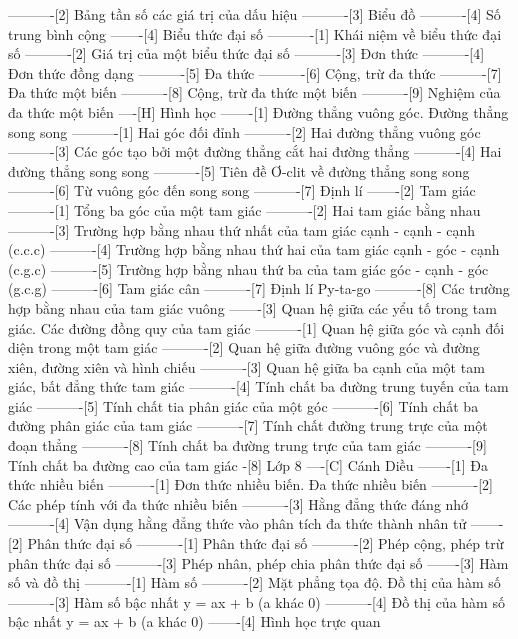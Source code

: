 ----------[2] Bảng tần số các giá trị của dấu hiệu
----------[3] Biểu đồ
----------[4] Số trung bình cộng
-------[4] Biểu thức đại số
----------[1] Khái niệm về biểu thức đại số
----------[2] Giá trị của một biểu thức đại số
----------[3] Đơn thức
----------[4] Đơn thức đồng dạng
----------[5] Đa thức
----------[6] Cộng, trừ đa thức
----------[7] Đa thức một biến
----------[8] Cộng, trừ đa thức một biến
----------[9] Nghiệm của đa thức một biến
----[H] Hình học
-------[1] Đường thẳng vuông góc. Đường thẳng song song
----------[1] Hai góc đối đỉnh
----------[2] Hai đường thẳng vuông góc
----------[3] Các góc tạo bởi một đường thẳng cắt hai đường thẳng
----------[4] Hai đường thẳng song song
----------[5] Tiên đề Ơ-clit về đường thẳng song song
----------[6] Từ vuông góc đến song song
----------[7] Định lí
-------[2] Tam giác
----------[1] Tổng ba góc của một tam giác
----------[2] Hai tam giác bằng nhau
----------[3] Trường hợp bằng nhau thứ nhất của tam giác cạnh - cạnh - cạnh (c.c.c)
----------[4] Trường hợp bằng nhau thứ hai của tam giác cạnh - góc - cạnh (c.g.c)
----------[5] Trường hợp bằng nhau thứ ba của tam giác góc - cạnh - góc (g.c.g)
----------[6] Tam giác cân
----------[7] Định lí Py-ta-go
----------[8] Các trường hợp bằng nhau của tam giác vuông
-------[3] Quan hệ giữa các yểu tố trong tam giác. Các đường đồng quy của tam giác
----------[1] Quan hệ giữa góc và cạnh đối diện trong một tam giác
----------[2] Quan hệ giữa đường vuông góc và đường xiên, đường xiên và hình chiếu
----------[3] Quan hệ giữa ba cạnh của một tam giác, bất đẳng thức tam giác
----------[4] Tính chất ba đường trung tuyến của tam giác
----------[5] Tính chất tia phân giác của một góc
----------[6] Tính chất ba đường phân giác của tam giác
----------[7] Tính chất đường trung trực của một đoạn thẳng
----------[8] Tính chất ba đường trung trực của tam giác
----------[9] Tính chất ba đường cao của tam giác
-[8] Lớp 8
----[C] Cánh Diều
-------[1] Đa thức nhiều biến
----------[1] Đơn thức nhiều biến. Đa thức nhiều biến
----------[2] Các phép tính với đa thức nhiều biến
----------[3] Hằng đẳng thức đáng nhớ
----------[4] Vận dụng hằng đẳng thức vào phân tích đa thức thành nhân tử
-------[2] Phân thức đại số
----------[1] Phân thức đại số
----------[2] Phép cộng, phép trừ phân thức đại số
----------[3] Phép nhân, phép chia phân thức đại số
-------[3] Hàm số và đồ thị
----------[1] Hàm số
----------[2] Mặt phẳng tọa độ. Đồ thị của hàm số
----------[3] Hàm số bậc nhất y = ax + b (a khác 0)
----------[4] Đồ thị của hàm số bậc nhất y = ax + b (a khác 0)
-------[4] Hình học trực quan
